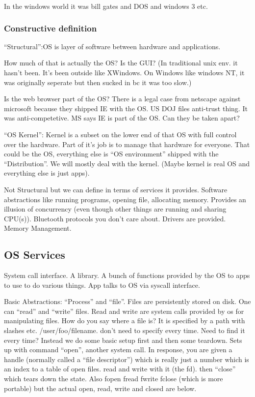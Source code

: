 \documentclass[10pt]{article}
\begin{document}
In the windows world it was bill gates and DOS and windows 3 etc. 

\subsubsection{Constructive definition}
``Structural'':OS is layer of software between hardware and applications. 

How much of that is actually the OS? Is the GUI? (In traditional unix env. it hasn't been. It's been outside like XWindows. On Windows like windows NT, it was originally seperate but then sucked in bc it was too slow.)

Is the web browser part of the OS? There is a legal case from netscape against microsoft because they shipped IE with the OS. US DOJ files anti-trust thing. It was anti-competetive. MS says IE is part of the OS. Can they be taken apart?

``OS Kernel'': Kernel is a subset on the lower end of that OS with full control over the hardware. Part of it's job is to manage that hardware for everyone. That could be the OS, everything else is ``OS environment'' shipped with the ``Distribution''. We will mostly deal with the kernel. (Maybe kernel is real OS and everything else is just apps). 

Not Structural but we can define in terms of services it provides. Software abstractions like running programs, opening file, allocating memory. Provides an illusion of concurrency (even though other things are running and sharing CPU(s)). Bluetooth protocols you don't care about. Drivers are provided. Memory Management.  

\subsection{OS Services}
System call interface. A library. A bunch of functions provided by the OS to apps to use to do various things. App talks to OS via syscall interface. 

Basic Abstractions: ``Process'' and ``file''. Files are persistently stored on disk. One can ``read'' and ``write'' files. Read and write are system calls provided by os for manipulating files.  How do you say where a file is? It is specified by a path with slashes etc. /user/foo/filename. don't need to specify every time. Need to find it every time? Instead we do some basic setup first and then some teardown. Sets up with command ``open'', another system call. In response, you are given a handle (normally called a ``file descriptor'') which is really just a number which is an index to a table of open files. read and write with it (the fd). then ``close'' which tears down the state. Also fopen fread fwrite fclose (which is more portable) but the actual open, read, write and closed are below. 
\end{document}
